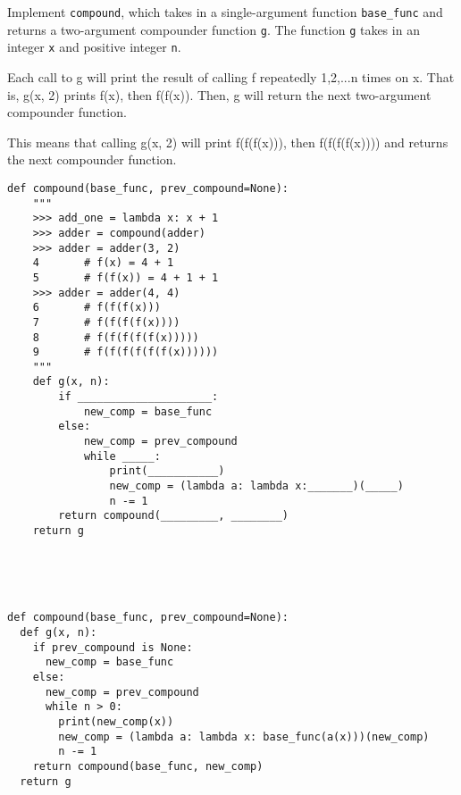 \begin{blocksection}
\question Implement \lstinline$compound$, which takes in a single-argument function \lstinline$base_func$ and returns a two-argument compounder function \lstinline$g$. The function \lstinline$g$ takes in an integer \lstinline$x$ and positive integer \lstinline$n$.

Each call to g will print the result of calling f repeatedly 1,2,...n times on x. That is, g(x, 2) prints f(x), then f(f(x)). Then, g will return the next two-argument compounder function.

This means that calling g(x, 2) will print f(f(f(x))), then f(f(f(f(x)))) and returns the next compounder function.

\begin{lstlisting}
def compound(base_func, prev_compound=None):
    """
    >>> add_one = lambda x: x + 1
    >>> adder = compound(adder)
    >>> adder = adder(3, 2)
    4       # f(x) = 4 + 1
    5       # f(f(x)) = 4 + 1 + 1
    >>> adder = adder(4, 4)
    6       # f(f(f(x)))
    7       # f(f(f(f(x))))
    8       # f(f(f(f(f(x)))))
    9       # f(f(f(f(f(f(x))))))
    """
    def g(x, n):
        if _____________________:
            new_comp = base_func
        else:
            new_comp = prev_compound
            while _____:
                print(___________)
                new_comp = (lambda a: lambda x:_______)(_____)
                n -= 1
        return compound(_________, ________)
    return g





\end{lstlisting}

\begin{solution}[1in]
\begin{lstlisting}
def compound(base_func, prev_compound=None):
  def g(x, n):
    if prev_compound is None:
      new_comp = base_func
    else:
      new_comp = prev_compound
      while n > 0:
        print(new_comp(x))
        new_comp = (lambda a: lambda x: base_func(a(x)))(new_comp)
        n -= 1
    return compound(base_func, new_comp)
  return g

\end{lstlisting}
\end{solution}
\end{blocksection}